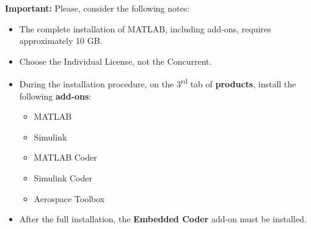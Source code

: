 \textbf{\textcolor{mRedBrown}{Important:}} Please, consider the following notes:
\begin{itemize}
\item The complete installation of MATLAB, including add-ons, requires approximately 10 GB.

\item Choose the Individual License, not the Concurrent.

\item During the installation procedure, on the 3\textsuperscript{rd} tab of \textbf{products}, install the following \textbf{add-ons}:
\begin{itemize}
	 \item MATLAB
	 \item Simulink
	 \item MATLAB Coder
	 \item Simulink Coder
	 \item Aerospace Toolbox
\end{itemize}

\item After the full installation, the \textbf{Embedded Coder} add-on must be installed.
\end{itemize}
